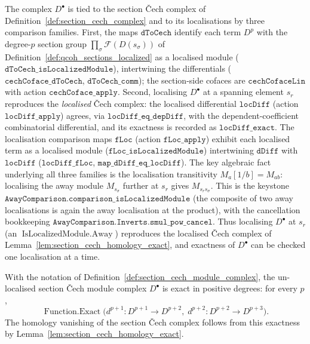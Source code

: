 \begin{definition}
  The complex \(D^\bullet\) is tied to the section {\v C}ech complex of
  Definition~\ref{def:section_cech_complex} and to its localisations by three
  comparison families. First, the maps \(\mathtt{dToCech}\) identify each term
  \(D^p\) with the degree-\(p\) section group
  \(\prod_\sigma \mathcal{F}(D(s_\sigma))\) of
  Definition~\ref{def:qcoh_sections_localized} as a localised module
  (\(\mathtt{dToCech\_isLocalizedModule}\)), intertwining the differentials
  (\(\mathtt{cechCoface\_dToCech}\), \(\mathtt{dToCech\_comm}\)); the section-side
  cofaces are \(\mathtt{cechCofaceLin}\) with action \(\mathtt{cechCoface\_apply}\).
  Second, localising \(D^\bullet\) at a spanning element \(s_r\) reproduces the
  \emph{localised} {\v C}ech complex: the localised differential \(\mathtt{locDiff}\)
  (action \(\mathtt{locDiff\_apply}\)) agrees, via
  \(\mathtt{locDiff\_eq\_depDiff}\), with the dependent-coefficient combinatorial
  differential, and its exactness is recorded as \(\mathtt{locDiff\_exact}\). The
  localisation comparison maps \(\mathtt{fLoc}\) (action \(\mathtt{fLoc\_apply}\))
  exhibit each localised term as a localised module
  (\(\mathtt{fLoc\_isLocalizedModule}\)) intertwining \(\mathtt{dDiff}\) with
  \(\mathtt{locDiff}\) (\(\mathtt{locDiff\_fLoc}\), \(\mathtt{map\_dDiff\_eq\_locDiff}\)).
  The key algebraic fact underlying all three families is the localisation
  transitivity \(M_a[1/b] = M_{ab}\): localising the away module \(M_{s_\sigma}\)
  further at \(s_r\) gives \(M_{s_r s_\sigma}\). This is the keystone
  \(\mathtt{AwayComparison.comparison\_isLocalizedModule}\) (the composite of two away
  localisations is again the away localisation at the product), with the cancellation
  bookkeeping \(\mathtt{AwayComparison.Inverts.smul\_pow\_cancel}\). Thus localising
  \(D^\bullet\) at \(s_r\) (an \(\operatorname{IsLocalizedModule.Away}\)) reproduces
  the localised Čech complex of Lemma~\ref{lem:section_cech_homology_exact}, and
  exactness of \(D^\bullet\) can be checked one localisation at a time.
\end{definition}

\begin{lemma}\leanok
  \label{lem:section_cech_module_exact}
  With the notation of Definition~\ref{def:section_cech_module_complex}, the
  un-localised section {\v C}ech module complex \(D^\bullet\) is exact in positive
  degrees: for every \(p\),
  \[
    \operatorname{Function.Exact}\bigl(d^{p+1} : D^{p+1} \to D^{p+2},\;
      d^{p+2} : D^{p+2} \to D^{p+3}\bigr).
  \]
  The homology vanishing of the section {\v C}ech complex follows from this exactness
  by Lemma~\ref{lem:section_cech_homology_exact}.
\end{lemma}

